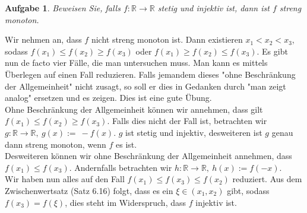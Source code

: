 \documentclass[a4paper, 20]{exam}
\newtheorem{ex}{Aufgabe}
\newcommand\RR{\mathbb{R}}
\begin{document}
\begin{ex}
Beweisen Sie, falls $f:\RR \longrightarrow \RR$ stetig und injektiv ist, dann ist $f$ streng monoton.
\end{ex}
\begin{solution}
Wir nehmen an, dass $f$ nicht streng monoton ist. Dann existieren $x_1 < x_2 < x_3$, sodass $f(x_1) \leq f(x_2) \geq f(x_3)$ oder $f(x_1)\geq f(x_2) \leq f(x_3)$. Es gibt nun de facto vier F\"alle, die man untersuchen muss. Man kann es mittels \"Uberlegen auf einen Fall reduzieren. Falls jemandem dieses "ohne Beschr\"ankung der Allgemeinheit" nicht zusagt, so soll er dies in Gedanken durch "man zeigt analog" ersetzen und es zeigen. Dies ist eine gute \"Ubung.\\
Ohne Beschr\"ankung der Allgemeinheit k\"onnen wir annehmen, dass gilt $f(x_1) \leq f(x_2) \geq f(x_3)$. Falls dies nicht der Fall ist, betrachten wir $g: \RR \longrightarrow \RR,~ g(x):=\ -f(x)$. $g$ ist stetig und injektiv, desweiteren ist $g$ genau dann streng monoton, wenn $f$ es ist.\\
Desweiteren k\"onnen wir ohne Beschr\"ankung der Allgemeinheit annehmen, dass $f(x_1) \leq f(x_3)$. Andernfalls betrachten wir $h: \RR \longrightarrow \RR,\ h(x):=f(-x)$.\\
Wir haben nun alles auf den Fall $f(x_1)\leq f(x_3) \leq f(x_2)$ reduziert. Aus dem Zwischenwertsatz (Satz 6.16) folgt, dass es ein $\xi \in (x_1, x_2)$ gibt, sodass $f(x_3)= f(\xi)$, dies steht im Widerspruch, dass $f$ injektiv ist.
\end{solution} 
\end{document}
